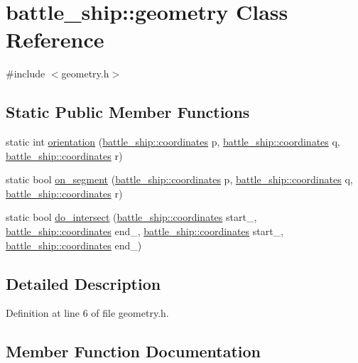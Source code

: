 \hypertarget{classbattle__ship_1_1geometry}{}\section{battle\+\_\+ship\+:\+:geometry Class Reference}
\label{classbattle__ship_1_1geometry}


{\ttfamily \#include $<$geometry.\+h$>$}

\subsection*{Static Public Member Functions}
\begin{DoxyCompactItemize}
\item 
static int \hyperlink{classbattle__ship_1_1geometry_abe15f3d75f562cb7f67f0facfad73628}{orientation} (\hyperlink{structbattle__ship_1_1coordinates}{battle\+\_\+ship\+::coordinates} p, \hyperlink{structbattle__ship_1_1coordinates}{battle\+\_\+ship\+::coordinates} q, \hyperlink{structbattle__ship_1_1coordinates}{battle\+\_\+ship\+::coordinates} r)
\item 
static bool \hyperlink{classbattle__ship_1_1geometry_ac6ab7fe7ccaeca7e7c0df8c0ebdbbce4}{on\+\_\+segment} (\hyperlink{structbattle__ship_1_1coordinates}{battle\+\_\+ship\+::coordinates} p, \hyperlink{structbattle__ship_1_1coordinates}{battle\+\_\+ship\+::coordinates} q, \hyperlink{structbattle__ship_1_1coordinates}{battle\+\_\+ship\+::coordinates} r)
\item 
static bool \hyperlink{classbattle__ship_1_1geometry_a8ed3083520abd281bf2c36568affb245}{do\+\_\+intersect} (\hyperlink{structbattle__ship_1_1coordinates}{battle\+\_\+ship\+::coordinates} start\+\_, \hyperlink{structbattle__ship_1_1coordinates}{battle\+\_\+ship\+::coordinates} end\+\_, \hyperlink{structbattle__ship_1_1coordinates}{battle\+\_\+ship\+::coordinates} start\+\_, \hyperlink{structbattle__ship_1_1coordinates}{battle\+\_\+ship\+::coordinates} end\+\_)
\end{DoxyCompactItemize}


\subsection{Detailed Description}


Definition at line 6 of file geometry.\+h.



\subsection{Member Function Documentation}
\mbox{\label{classbattle__ship_1_1geometry_a8ed3083520abd281bf2c36568affb245}} 
